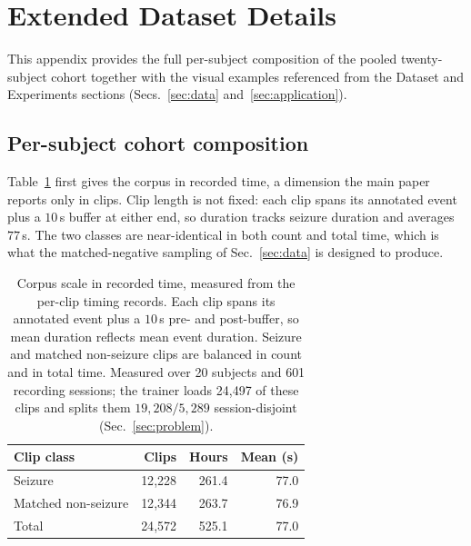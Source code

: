\section{Extended Dataset Details}
\label{sec:dataextra}

This appendix provides the full per-subject composition of the pooled
twenty-subject cohort together with the visual examples referenced from the
Dataset and Experiments sections (Secs.~\ref{sec:data} and~\ref{sec:application}).

\subsection{Per-subject cohort composition}
\label{sec:dataextra:cohort}
Table~\ref{tab:corpusscale} first gives the corpus in recorded time, a dimension the
main paper reports only in clips. Clip length is not fixed: each clip spans its
annotated event plus a $10$\,s buffer at either end, so duration tracks seizure
duration and averages $77$\,s. The two classes are near-identical in both count and
total time, which is what the matched-negative sampling of Sec.~\ref{sec:data} is
designed to produce.

\begin{table}[tb]
\centering
\caption{Corpus scale in recorded time, measured from the per-clip timing records.
Each clip spans its annotated event plus a $10$\,s pre- and post-buffer, so mean
duration reflects mean event duration. Seizure and matched non-seizure clips are
balanced in count and in total time. Measured over 20 subjects and 601 recording
sessions; the trainer loads 24{,}497 of these clips and splits them
$19{,}208/5{,}289$ session-disjoint (Sec.~\ref{sec:problem}).}
\label{tab:corpusscale}
\setlength{\tabcolsep}{4pt}
\renewcommand{\arraystretch}{1.15}
\begin{tabular}{@{}l r r r@{}}
\toprule
\textbf{Clip class} & \textbf{Clips} & \textbf{Hours} & \textbf{Mean (s)} \\
\midrule
Seizure              & 12{,}228 & 261.4 & 77.0 \\
Matched non-seizure  & 12{,}344 & 263.7 & 76.9 \\
\midrule
Total                & 24{,}572 & 525.1 & 77.0 \\
\bottomrule
\end{tabular}
\end{table}


